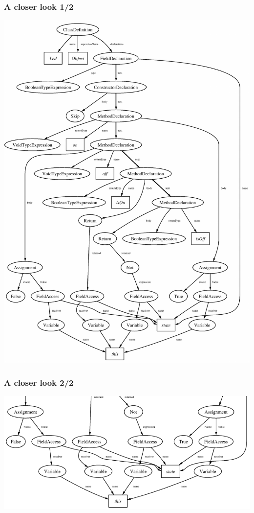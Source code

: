 \documentclass[11pt]{beamer}  %
\begin{document}
\begin{frame}\frametitle{A closer look 1/2}

\begin{center}
\includegraphics[scale=1]{pictures/led_logica.pdf}
\end{center}

\end{frame}

\begin{frame}\frametitle{A closer look 2/2}

\begin{center}
\includegraphics[scale=1]{pictures/led_logica_2.pdf}
\end{center}

\end{frame}
\end{document}
